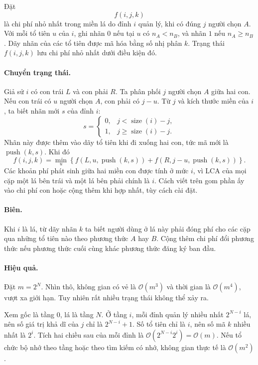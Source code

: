 \documentclass[11pt]{article}
\newcommand{\Oh}{\mathcal{O}}
\begin{document}
Đặt
\[
  f(i,j,k)
\]
là chi phí nhỏ nhất trong miền lá do đỉnh \(i\) quản lý, khi có đúng \(j\)
người chọn \(A\). Với mỗi tổ tiên \(u\) của \(i\), ghi nhãn \(0\) nếu tại
\(u\) có \(n_A<n_B\), và nhãn \(1\) nếu \(n_A\ge n_B\). Dãy nhãn của các tổ
tiên được mã hóa bằng số nhị phân \(k\). Trạng thái \(f(i,j,k)\) lưu chi phí
nhỏ nhất dưới điều kiện đó.

\paragraph{Chuyển trạng thái.}
Giả sử \(i\) có con trái \(L\) và con phải \(R\). Ta phân phối \(j\) người
chọn \(A\) giữa hai con. Nếu con trái có \(u\) người chọn \(A\), con phải có
\(j-u\). Từ \(j\) và kích thước miền của \(i\), ta biết nhãn mới \(s\) của
đỉnh \(i\):
\[
  s=
  \begin{cases}
    0, & j < \operatorname{size}(i)-j,\\
    1, & j \ge \operatorname{size}(i)-j.
  \end{cases}
\]
Nhãn này được thêm vào dãy tổ tiên khi đi xuống hai con, tức mã mới là
\(\operatorname{push}(k,s)\). Khi đó
\[
  f(i,j,k)=
  \min_u
  \left\{
    f(L,u,\operatorname{push}(k,s))
    +f(R,j-u,\operatorname{push}(k,s))
  \right\}.
\]
Các khoản phí phát sinh giữa hai miền con được tính ở mức \(i\), vì LCA của
mọi cặp một lá bên trái và một lá bên phải chính là \(i\). Cách viết trên gom
phần ấy vào chi phí con hoặc cộng thêm khi hợp nhất, tùy cách cài đặt.

\paragraph{Biên.}
Khi \(i\) là lá, từ dãy nhãn \(k\) ta biết người dùng ở lá này phải đóng phí
cho các cặp qua những tổ tiên nào theo phương thức \(A\) hay \(B\). Cộng thêm
chi phí đổi phương thức nếu phương thức cuối cùng khác phương thức đăng ký ban
đầu.

\paragraph{Hiệu quả.}
Đặt \(m=2^N\). Nhìn thô, không gian có vẻ là \(\Oh(m^3)\) và thời gian là
\(\Oh(m^4)\), vượt xa giới hạn. Tuy nhiên rất nhiều trạng thái không thể xảy
ra.

Xem gốc là tầng \(0\), lá là tầng \(N\). Ở tầng \(i\), mỗi đỉnh quản lý nhiều
nhất \(2^{N-i}\) lá, nên số giá trị khả dĩ của \(j\) chỉ là \(2^{N-i}+1\).
Số tổ tiên chỉ là \(i\), nên số mã \(k\) nhiều nhất là \(2^i\). Tích hai chiều
sau của mỗi đỉnh là \(\Oh(2^{N-i}2^i)=\Oh(m)\). Nếu tổ chức bộ nhớ theo tầng
hoặc theo tìm kiếm có nhớ, không gian thực tế là \(\Oh(m^2)\).
\end{document}
